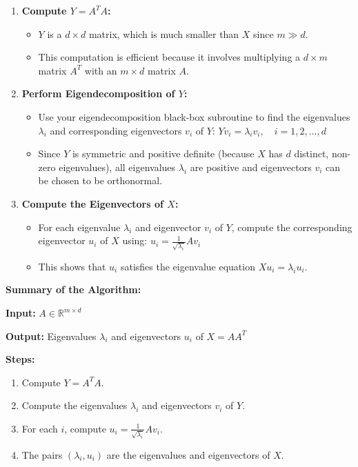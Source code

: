 \documentclass{article}
\begin{document}
\begin{enumerate}
    \item \textbf{Compute $Y = A^T A$:}
    \begin{itemize}
        \item $Y$ is a $d \times d$ matrix, which is much smaller than $X$ since $m \gg d$.
        \item This computation is efficient because it involves multiplying a $d \times m$ matrix $A^T$ with an $m \times d$ matrix $A$.
    \end{itemize}

    \item \textbf{Perform Eigendecomposition of $Y$:}
    \begin{itemize}
        \item Use your eigendecomposition black-box subroutine to find the eigenvalues $\lambda_i$ and corresponding eigenvectors $v_i$ of $Y$:
        $Y v_i = \lambda_i v_i, \quad i = 1, 2, \dots, d$
        \item Since $Y$ is symmetric and positive definite (because $X$ has $d$ distinct, non-zero eigenvalues), all eigenvalues $\lambda_i$ are positive and eigenvectors $v_i$ can be chosen to be orthonormal.
    \end{itemize}

    \item \textbf{Compute the Eigenvectors of $X$:}
    \begin{itemize}
        \item For each eigenvalue $\lambda_i$ and eigenvector $v_i$ of $Y$, compute the corresponding eigenvector $u_i$ of $X$ using:
        $u_i = \frac{1}{\sqrt{\lambda_i}} A v_i$
        \item This shows that $u_i$ satisfies the eigenvalue equation $X u_i = \lambda_i u_i$.
    \end{itemize}
\end{enumerate}

\textbf{Summary of the Algorithm:}

\textbf{Input:} $A \in \mathbb{R}^{m \times d}$

\textbf{Output:} Eigenvalues $\lambda_i$ and eigenvectors $u_i$ of $X = AA^T$

\textbf{Steps:}
\begin{enumerate}
    \item Compute $Y = A^T A$.
    \item Compute the eigenvalues $\lambda_i$ and eigenvectors $v_i$ of $Y$.
    \item For each $i$, compute $u_i = \frac{1}{\sqrt{\lambda_i}} A v_i$.
    \item The pairs $(\lambda_i, u_i)$ are the eigenvalues and eigenvectors of $X$.
\end{enumerate}
\end{document}
